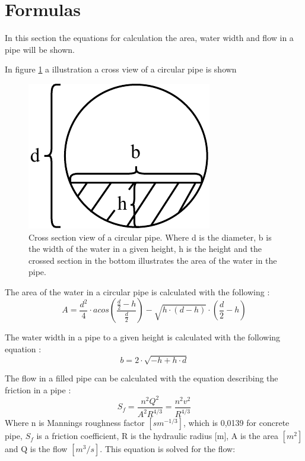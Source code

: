 \newpage
\section{Formulas}\label{app:formulas}
In this section the equations for calculation the area, water width and flow in a pipe will be shown.
%


In figure \ref{fig:calc_water_pipe_width} a illustration a cross view of a circular pipe is shown
\begin{figure}[H]
	\centering
	\includegraphics[width=0.20\textheight]{report/appendix/figures/calc_water_pipe_width.pdf}
	\caption{Cross section view of a circular pipe. Where d is the diameter, b is the width of the water in a given height, h is the height and the crossed section in the bottom illustrates the area of the water in the pipe.}
	\label{fig:calc_water_pipe_width}
\end{figure}

The area of the water in a circular pipe is calculated with the following \cite{ikke_stationear}: 
\begin{equation}%
	A = \frac {d^2}{4} \cdot acos \left(\frac{\frac{d}{2}-h}{\frac{d}{2}}\right)-\sqrt{h\cdot (d-h)}\cdot  \left(\frac{d}{2}-h\right)
\end{equation}

The water width in a pipe to a given height is calculated with the following equation \cite{ikke_stationear}:
\begin{equation}
	b = 2 \cdot \sqrt{-h+h\cdot d}
\end{equation}

The flow in a filled pipe can be calculated with the equation describing the friction in a pipe \cite{ikke_stationear}:
\begin{equation}
	S_f = \frac{n^2 Q^2}{A^2R^{4/3}}= \frac{n^2 v^2}{R^{4/3}}
\label{Manning_formulav2}
\end{equation}
Where n is Mannings roughness factor $[sm^{-1/3}]$, which is 0,0139 for concrete pipe, $S_f$ is a friction coefficient, R is the hydraulic radius [m], A is the area $[m^2]$ and Q is the flow $[m^3/s]$. This equation is solved for the flow:

